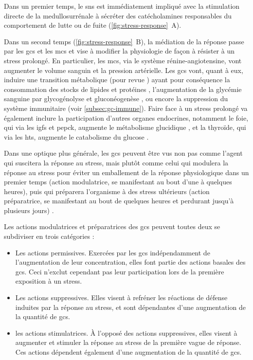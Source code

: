 \documentclass[../main.tex]{subfiles}
\begin{document}
Dans un premier temps, le \gls{sns} est immédiatement impliqué avec la stimulation directe de la medullosurrénale à sécréter des catécholamines responsables du comportement de lutte ou de fuite (\autoref{fig:stress-response}~A).
\par
Dans un second temps (\autoref{fig:stress-response}~B), la médiation de la réponse passe par les \glspl{gc} et les \glspl{mc} et vise à modifier la physiologie de façon à résister à un stress prolongé.
En particulier, les \glspl{mc}, via le système rénine-angiotensine, vont augmenter le volume sanguin et la pression artérielle.
Les \glspl{gc} vont, quant à eux, induire une transition métabolique (pour revue \citealp{Munck2010,Weissman1990}) ayant pour conséquence la consommation des stocks de lipides et protéines \citep{Richard1993}, l'augmentation de la glycémie sanguine par glycogénolyse et gluconéogenèse \citep{Eigler1979}, ou encore la suppression du système immunitaire (voir \autoref{subsec:gc-immune}).
Faire face à un stress prolongé va également inclure la participation d'autres organes endocrines, notamment le foie, qui via les \glspl{igf} et \gls{pepck}, augmente le métabolisme glucidique \citep{Exton1987,Weissman1990}, et la thyroïde, qui via les \glspl{ht}, augmente le catabolisme du glucose \citep{Weissman1990}.
\par
Dans une optique plus générale, les \glspl{gc} peuvent être vus non pas comme l'agent qui suscitera la réponse au stress, mais plutôt comme celui qui modulera la réponse au stress pour éviter un emballement de la réponse physiologique dans un premier temps (action modulatrice, se manifestant au bout d'une à quelques heures), puis qui préparera l'organisme à des stress ultérieurs (action préparatrice, se manifestant au bout de quelques heures et perdurant jusqu'à plusieurs jours) \citet{Sapolsky2000}.
\par
Les actions modulatrices et préparatrices des \glspl{gc} peuvent toutes deux se subdiviser en trois catégories :
\begin{itemize}
\item Les actions permissives. Exercées par les \glspl{gc} indépendamment de l'augmentation de leur concentration, elles font partie des actions basales des \glspl{gc}.
Ceci n'exclut cependant pas leur participation lors de la première exposition à un stress.
\item Les actions suppressives. Elles visent à refréner les réactions de défense induites par la réponse au stress, et sont dépendantes d'une augmentation de la quantité de \glspl{gc}.
\item les actions stimulatrices. À l'opposé des actions suppressives, elles visent à augmenter et stimuler la réponse au stress de la première vague de réponse.
Ces actions dépendent également d'une augmentation de la quantité de \glspl{gc}.
\end{itemize}
\end{document}
